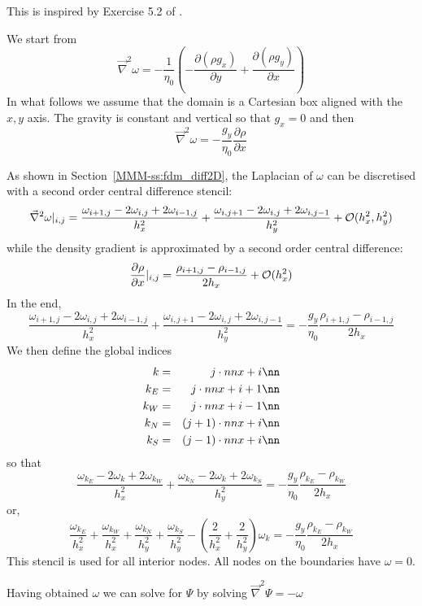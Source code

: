 This \stone is inspired by Exercise 5.2 of \textcite{gery19book}.

We start from
\begin{equation}
\vec\nabla^2 \omega = -\frac{1}{\eta_0} \left( -\frac{\partial (\rho g_x)}{\partial y}
+\frac{\partial (\rho g_y)}{\partial x} \right)
\end{equation}
In what follows we assume that the domain is a Cartesian box aligned 
with the $x,y$ axis. The gravity is constant and vertical so that $g_x=0$ and
then 
\begin{equation}
\vec\nabla^2 \omega 
= -\frac{g_y}{\eta_0} 
\frac{\partial \rho}{\partial x} 
\end{equation}


As shown in Section~\ref{MMM-ss:fdm_diff2D}, the Laplacian of $\omega$
can be discretised with a second order central difference stencil:
\[
\vec\nabla^2 \omega |_{i,j} 
= \frac{\omega_{i+1,j} -2\omega_{i,j} + 2\omega_{i-1,j}}{h_x^2}
+ \frac{\omega_{i,j+1} -2\omega_{i,j} + 2\omega_{i,j-1}}{h_y^2}
+{\cal O}(h_x^2,h_y^2)
\]
while the density gradient is approximated by a second order
central difference:
\[
\frac{\partial \rho}{\partial x}|_{i,j} 
= \frac{\rho_{i+1,j}-\rho_{i-1,j}}{2 h_x} + {\cal O}(h_x^2)
\]
In the end, 
\[
\frac{\omega_{i+1,j} -2\omega_{i,j} + 2\omega_{i-1,j}}{h_x^2}
+ \frac{\omega_{i,j+1} -2\omega_{i,j} + 2\omega_{i,j-1}}{h_y^2}
= -\frac{g_y}{\eta_0} 
\frac{\rho_{i+1,j}-\rho_{i-1,j}}{2 h_x} 
\]
We then define the global indices
\begin{eqnarray}
k  &=& j \cdot nnx + i \nn\\
k_E &=& j \cdot nnx + i+1 \nn\\
k_W &=& j \cdot nnx + i-1 \nn\\
k_N &=& (j+1) \cdot nnx + i \nn\\
k_S &=& (j-1) \cdot nnx + i \nn
\end{eqnarray}
so that 
\[
\frac{\omega_{k_E} -2\omega_{k} + 2\omega_{k_W}}{h_x^2}
+ 
\frac{\omega_{k_N} -2\omega_{k} + 2\omega_{k_S}}{h_y^2}
= -\frac{g_y}{\eta_0} 
\frac{\rho_{k_E}-\rho_{k_W}}{2 h_x} 
\]
or, 
\[
\frac{\omega_{k_E}}{h_x^2}+
\frac{\omega_{k_W}}{h_x^2}+
\frac{\omega_{k_N}}{h_y^2}+
\frac{\omega_{k_S}}{h_y^2}-
\left(\frac{2}{h_x^2} + \frac{2}{h_y^2} \right) \omega_k
= -\frac{g_y}{\eta_0} 
\frac{\rho_{k_E}-\rho_{k_W}}{2 h_x} 
\]
This stencil is used for all interior nodes. All nodes on the boundaries 
have $\omega=0$.

Having obtained $\omega$ we can solve for $\Psi$ by solving
$\vec\nabla^2 \Psi = -\omega$

